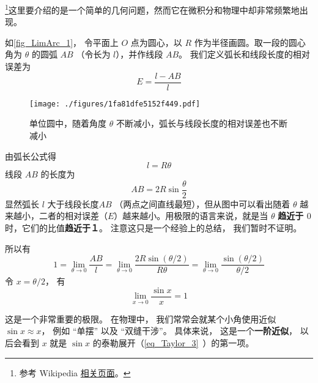 

\footnote{参考 Wikipedia \href{https://en.wikipedia.org/wiki/Small-angle_approximation}{相关页面}。}这里要介绍的是一个简单的几何问题，然而它在微积分和物理中却非常频繁地出现。

如\autoref{fig_LimArc_1}， 令平面上 $O$ 点为圆心，以 $R$ 作为半径画圆。取一段的圆心角为 $\theta $ 的圆弧 $AB$ （令长为 $l$），并作线段 $AB$。 我们定义弧长和线段长度的相对误差为
\begin{equation}
E = \frac{l - AB}{l}
\end{equation}

\begin{figure}[ht]
\centering
\texttt{[image: ./figures/1fa81dfe5152f449.pdf]}
\caption{单位圆中，随着角度 $\theta$ 不断减小，弧长与线段长度的相对误差也不断减小}\label{fig_LimArc_1}
\end{figure}

由弧长公式得
\begin{equation} \label{eq_LimArc_1}
l = R\theta 
\end{equation}
线段 $AB$ 的长度为
\begin{equation}\label{eq_LimArc_2}
AB = 2R\sin \frac{\theta }{2}
\end{equation}
显然弧长 $l$ 大于线段长度$AB$ （两点之间直线最短），但从图中可以看出随着 $\theta $ 越来越小，二者的相对误差（$E$）越来越小。用极限的语言来说，就是当 $\theta $ \textbf{趋近于 $0$ } 时，它们的比值\textbf{趋近于１}。 注意这只是一个经验上的总结， 我们暂时不证明。

所以有
\begin{equation}
1=\lim_{\theta\to 0} \frac{AB}{l} = \lim_{\theta\to 0} \frac{2R\sin (\theta/2)}{R\theta} 
= \lim_{\theta\to 0}\frac{\sin (\theta/2)}{\theta/2}
\end{equation}
令 $x = \theta/2$， 有
\begin{equation}
\lim_{x\to 0} \frac{\sin x}{x} = 1
\end{equation}

这是一个非常重要的极限。 在物理中， 我们常常会就某个小角使用近似 $\sin x \approx x$， 例如 “单摆” 以及 “双缝干涉”。 具体来说， 这是一个\textbf{一阶近似}，  以后会看到 $x$ 就是 $\sin x$ 的泰勒展开（\autoref{eq_Taylor_3}~）的第一项。

